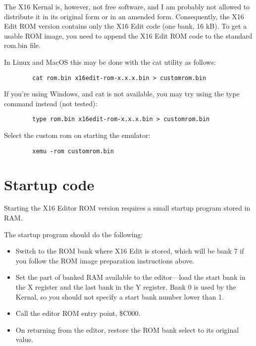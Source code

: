 \documentclass{article}
\begin{document}
    The X16 Kernal is, however, not free software, and I am probably not allowed to distribute it in its
    original form or in an amended form. Consequently, the X16 Edit ROM version contains only the X16 Edit code (one bank, 16 kB). To get a 
    usable ROM image, you need to append the X16 Edit ROM code to the standard
    rom.bin file.

    In Linux and MacOS this may be done with the cat utility as follows: 
    
    \begin{verbatim}
        cat rom.bin x16edit-rom-x.x.x.bin > customrom.bin
    \end{verbatim}

    If you're using Windows, and cat is not available, you may try using the type command instead (not tested):
    
    \begin{verbatim}
        type rom.bin x16edit-rom-x.x.x.bin > customrom.bin
    \end{verbatim}

    Select the custom rom on starting the emulator: 
    
    \begin{verbatim}
        xemu -rom customrom.bin
    \end{verbatim}

\section{Startup code}

    Starting the X16 Editor ROM version requires a small startup program stored in RAM.

    The startup program should do the following:

    \begin{itemize}
        \item Switch to the ROM bank where X16 Edit is stored, which will be bank 7 if you follow the ROM image preparation instructions above.

        \item Set the part of banked RAM available to the editor---load the start bank in the X register and the last bank in the Y register.
        Bank 0 is used by the Kernal, so you should not specify a start bank number lower than 1.

        \item Call the editor ROM entry point, \$C000.

        \item On returning from the editor, restore the ROM bank select to its original value.
    \end{itemize}
\end{document}
